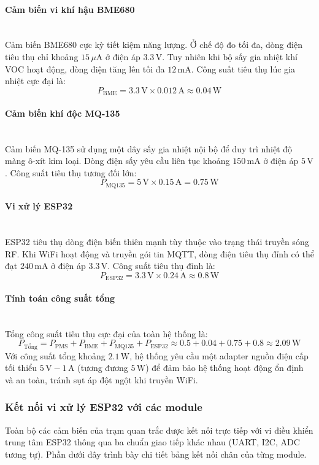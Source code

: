 \documentclass[12pt,a4paper]{article}
\begin{document}
\paragraph{Cảm biến vi khí hậu BME680}\mbox{}\\
Cảm biến BME680 cực kỳ tiết kiệm năng lượng. Ở chế độ đo tối đa, dòng điện tiêu thụ chỉ khoảng $15\,\mu\text{A}$ ở điện áp $3.3\,\text{V}$. Tuy nhiên khi bộ sấy gia nhiệt khí VOC hoạt động, dòng điện tăng lên tối đa $12\,\text{mA}$. Công suất tiêu thụ lúc gia nhiệt cực đại là:
\[
P_{\text{BME}} = 3.3\,\text{V} \times 0.012\,\text{A} \approx 0.04\,\text{W}
\]

\paragraph{Cảm biến khí độc MQ-135}\mbox{}\\
Cảm biến MQ-135 sử dụng một dây sấy gia nhiệt nội bộ để duy trì nhiệt độ màng ô-xít kim loại. Dòng điện sấy yêu cầu liên tục khoảng $150\,\text{mA}$ ở điện áp $5\,\text{V}$. Công suất tiêu thụ tương đối lớn:
\[
P_{\text{MQ135}} = 5\,\text{V} \times 0.15\,\text{A} = 0.75\,\text{W}
\]

\paragraph{Vi xử lý ESP32}\mbox{}\\
ESP32 tiêu thụ dòng điện biến thiên mạnh tùy thuộc vào trạng thái truyền sóng RF. Khi WiFi hoạt động và truyền gói tin MQTT, dòng điện tiêu thụ đỉnh có thể đạt $240\,\text{mA}$ ở điện áp $3.3\,\text{V}$. Công suất tiêu thụ đỉnh là:
\[
P_{\text{ESP32}} = 3.3\,\text{V} \times 0.24\,\text{A} \approx 0.8\,\text{W}
\]

\paragraph{Tính toán công suất tổng}\mbox{}\\
Tổng công suất tiêu thụ cực đại của toàn hệ thống là:
\[
P_{\text{Tổng}} = P_{\text{PMS}} + P_{\text{BME}} + P_{\text{MQ135}} + P_{\text{ESP32}} \approx 0.5 + 0.04 + 0.75 + 0.8 \approx 2.09\,\text{W}
\]
Với công suất tổng khoảng $2.1\,\text{W}$, hệ thống yêu cầu một adapter nguồn điện cấp tối thiểu $5\,\text{V} - 1\,\text{A}$ (tương đương $5\,\text{W}$) để đảm bảo hệ thống hoạt động ổn định và an toàn, tránh sụt áp đột ngột khi truyền WiFi.

\subsubsection{Kết nối vi xử lý ESP32 với các module}
Toàn bộ các cảm biến của trạm quan trắc được kết nối trực tiếp với vi điều khiển trung tâm ESP32 thông qua ba chuẩn giao tiếp khác nhau (UART, I2C, ADC tương tự). Phần dưới đây trình bày chi tiết bảng kết nối chân của từng module.
\end{document}

